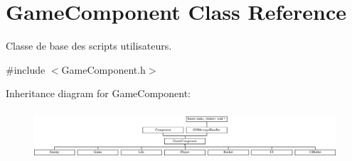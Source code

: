 \hypertarget{class_game_component}{}\section{Game\+Component Class Reference}
\label{class_game_component}


Classe de base des scripts utilisateurs.  




{\ttfamily \#include $<$Game\+Component.\+h$>$}

Inheritance diagram for Game\+Component\+:\begin{figure}[H]
\begin{center}
\leavevmode
\includegraphics[height=1.839080cm]{class_game_component}
\end{center}
\end{figure}
